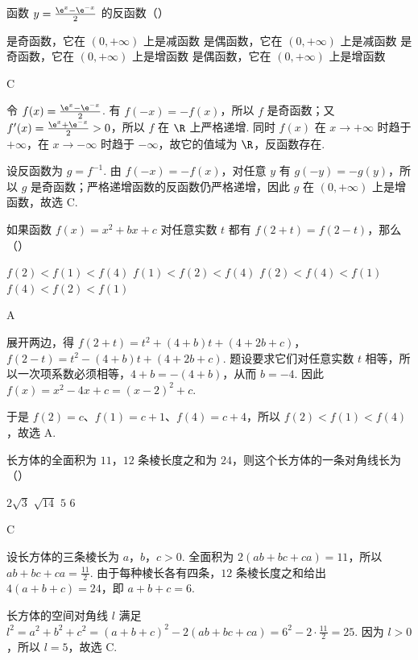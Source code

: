 \documentclass[UTF8,a4paper,oneside,11pt]{ctexbook}
\begin{document}
\begin{problem}
函数 \(y=\frac{\e^x-\e^{-x}}{2}\) 的反函数（\quad）

\choices
    {是奇函数，它在 \((0,+\infty)\) 上是减函数}
    {是偶函数，它在 \((0,+\infty)\) 上是减函数}
    {是奇函数，它在 \((0,+\infty)\) 上是增函数}
    {是偶函数，它在 \((0,+\infty)\) 上是增函数}

\begin{answer}
C
\end{answer}

\begin{solution}
令 \(f(x)=\frac{\e^x-\e^{-x}}2\). 有 \(f(-x)=-f(x)\)，所以 \(f\) 是奇函数；又
\(f'(x)=\frac{\e^x+\e^{-x}}2>0\)，所以 \(f\) 在 \(\R\) 上严格递增. 同时 \(f(x)\) 在 \(x\to+\infty\) 时趋于 \(+\infty\)，在 \(x\to-\infty\) 时趋于 \(-\infty\)，故它的值域为 \(\R\)，反函数存在.

设反函数为 \(g=f^{-1}\). 由 \(f(-x)=-f(x)\)，对任意 \(y\) 有 \(g(-y)=-g(y)\)，所以 \(g\) 是奇函数；严格递增函数的反函数仍严格递增，因此 \(g\) 在 \((0,+\infty)\) 上是增函数，故选 C.
\end{solution}
\end{problem}

\begin{problem}
如果函数 \(f(x)=x^2+bx+c\) 对任意实数 \(t\) 都有 \(f(2+t)=f(2-t)\)，那么（\quad）

\choices
    {\(f(2)<f(1)<f(4)\)}
    {\(f(1)<f(2)<f(4)\)}
    {\(f(2)<f(4)<f(1)\)}
    {\(f(4)<f(2)<f(1)\)}

\begin{answer}
A
\end{answer}

\begin{solution}
展开两边，得
\(f(2+t)=t^2+(4+b)t+(4+2b+c)\)，
\(f(2-t)=t^2-(4+b)t+(4+2b+c)\). 题设要求它们对任意实数 \(t\) 相等，所以一次项系数必须相等，\(4+b=-(4+b)\)，从而 \(b=-4\). 因此
\(f(x)=x^2-4x+c=(x-2)^2+c\).

于是 \(f(2)=c\)、\(f(1)=c+1\)、\(f(4)=c+4\)，所以 \(f(2)<f(1)<f(4)\)，故选 A.
\end{solution}
\end{problem}

\begin{problem}
长方体的全面积为 \(11\)，\(12\) 条棱长度之和为 \(24\)，则这个长方体的一条对角线长为（\quad）

\choices
    {\(2\sqrt{3}\)}
    {\(\sqrt{14}\)}
    {\(5\)}
    {\(6\)}

\begin{answer}
C
\end{answer}

\begin{solution}
设长方体的三条棱长为 \(a\)，\(b\)，\(c>0\). 全面积为 \(2(ab+bc+ca)=11\)，所以 \(ab+bc+ca=\frac{11}{2}\). 由于每种棱长各有四条，\(12\) 条棱长度之和给出 \(4(a+b+c)=24\)，即 \(a+b+c=6\).

长方体的空间对角线 \(l\) 满足
\(l^2=a^2+b^2+c^2=(a+b+c)^2-2(ab+bc+ca)=6^2-2\cdot\frac{11}{2}=25\). 因为 \(l>0\)，所以 \(l=5\)，故选 C.
\end{solution}
\end{problem}
\end{document}

